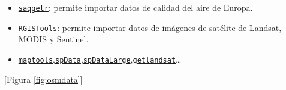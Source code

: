 \documentclass[
  spanish,
]{book}
\newenvironment{Shaded}{\begin{snugshade}}{\end{snugshade}}
\newcommand{\AttributeTok}[1]{\textcolor[rgb]{0.77,0.63,0.00}{#1}}
\newcommand{\CommentTok}[1]{\textcolor[rgb]{0.56,0.35,0.01}{\textit{#1}}}
\newcommand{\FloatTok}[1]{\textcolor[rgb]{0.00,0.00,0.81}{#1}}
\newcommand{\FunctionTok}[1]{\textcolor[rgb]{0.00,0.00,0.00}{#1}}
\newcommand{\NormalTok}[1]{#1}
\newcommand{\OtherTok}[1]{\textcolor[rgb]{0.56,0.35,0.01}{#1}}
\newcommand{\SpecialCharTok}[1]{\textcolor[rgb]{0.00,0.00,0.00}{#1}}
\newcommand{\StringTok}[1]{\textcolor[rgb]{0.31,0.60,0.02}{#1}}
\theoremstyle{break}
\begin{document}
\begin{itemize}
\item
  \href{https://github.com/skgrange/saqgetr}{\texttt{saqgetr}}: permite importar datos de calidad del aire de Europa.
\item
  \href{https://github.com/spatialstatisticsupna/RGISTools}{\texttt{RGISTools}}: permite importar datos de imágenes de satélite de Landsat, MODIS y Sentinel.
\item
  \href{https://CRAN.R-project.org/package=maptools}{\texttt{maptools}},\href{https://CRAN.R-project.org/package=spData}{\texttt{spData}},\href{https://CRAN.R-project.org/package=spDataLarge}{\texttt{spDataLarge}},\href{https://CRAN.R-project.org/package=getlandsat}{\texttt{getlandsat}}\ldots{}
\end{itemize}

\begin{Shaded}
\end{Shaded}

{[}Figura \ref{fig:osmdata}{]}
\end{document}
